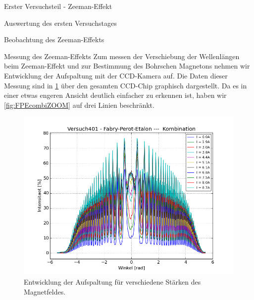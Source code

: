 \documentclass[pdftex, a4paper,11pt, twoside, ngerman]{report}
\begin{document}
\begin{chapter}{Erster Versuchsteil - Zeeman-Effekt}
\begin{section}{Auswertung des ersten Versuchstages}
\begin{subsection}{Beobachtung des Zeeman-Effekts}
      \end{subsection}
      
      
      
      \begin{subsection}{Messung des Zeeman-Effekts}
        \label{chp:Zeeman:sec:AuswertungMessung}
        Zum messen der Verschiebung der Wellenlängen beim Zeeman-Effekt und zur
        Bestimmung des Bohrschen Magnetons nehmen wir Entwicklung der
        Aufspaltung mit der CCD-Kamera auf. Die Daten dieser Messung sind in
        \cref{fig:FPEcombi} über den gesamten CCD-Chip graphisch dargestellt.
        Da es in einer etwas engeren Ansicht deutlich einfacher zu erkennen ist,
        haben wir \cref{fig:FPEcombiZOOM} auf drei Linien beschränkt.
        \begin{figure}[ht]
          \centering
          \begin{minipage}{0.48\textwidth}
            \centering
            \includegraphics[width=\textwidth]
      {Figures/Versuch401-Fabry-Perot-Etalon-Kombination_Winkel_Intensitaet.png}
            \caption{Entwicklung der Aufspaltung für verschiedene Stärken des
                Magnetfeldes.}
            \label{fig:FPEcombi}
          \end{minipage}\quad
          \begin{minipage}{0.48\textwidth}
            \centering

\end{minipage}
\end{figure}
\end{subsection}
\end{section}
\end{chapter}
\end{document}
